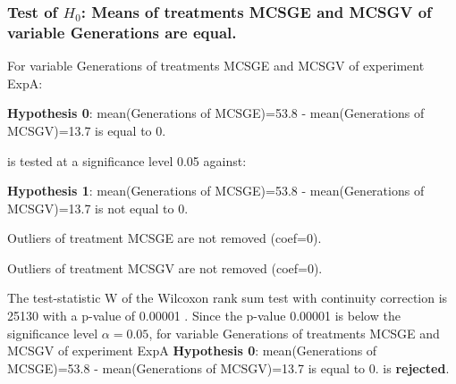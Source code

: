 \begin{frame}[t]
 \frametitle{Test of $H_{0}$: Means of treatments MCSGE and MCSGV of variable Generations are equal. }
 \scriptsize
 For variable Generations of treatments MCSGE and MCSGV of experiment ExpA:

\vspace{1mm}
{\bf Hypothesis 0}: mean(Generations of MCSGE)=53.8 - mean(Generations of MCSGV)=13.7 is equal to 0.


 \begin{center} is tested at a significance level 0.05 against: \end{center}

{\bf Hypothesis 1}: mean(Generations of MCSGE)=53.8 - mean(Generations of MCSGV)=13.7 is not equal to 0.
\vspace{1mm}
\vspace{1mm}

 Outliers of treatment MCSGE  are not removed (coef=0).

 Outliers of treatment MCSGV  are not removed (coef=0).
\vspace{1mm}
 
 The test-statistic W of the Wilcoxon rank sum test with continuity correction is 25130 with a p-value of 0.00001 .
 Since the p-value 0.00001 is below the significance level $\alpha= 0.05 $,
 for variable Generations of treatments MCSGE and MCSGV of experiment ExpA 
 {\bf Hypothesis 0}: mean(Generations of MCSGE)=53.8 - mean(Generations of MCSGV)=13.7 is equal to 0.
is {\bf rejected}.

 \end{frame}
